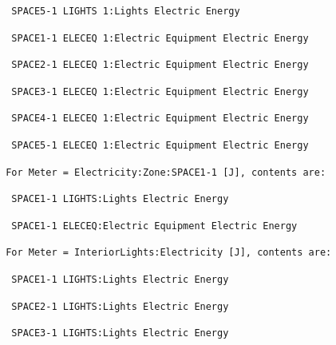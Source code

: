 \begin{lstlisting}
  SPACE5-1 LIGHTS 1:Lights Electric Energy
\end{lstlisting}

\begin{lstlisting}
  SPACE1-1 ELECEQ 1:Electric Equipment Electric Energy
\end{lstlisting}

\begin{lstlisting}
  SPACE2-1 ELECEQ 1:Electric Equipment Electric Energy
\end{lstlisting}

\begin{lstlisting}
  SPACE3-1 ELECEQ 1:Electric Equipment Electric Energy
\end{lstlisting}

\begin{lstlisting}
  SPACE4-1 ELECEQ 1:Electric Equipment Electric Energy
\end{lstlisting}

\begin{lstlisting}
  SPACE5-1 ELECEQ 1:Electric Equipment Electric Energy
\end{lstlisting}

\begin{lstlisting}
 For Meter = Electricity:Zone:SPACE1-1 [J], contents are:
\end{lstlisting}

\begin{lstlisting}
  SPACE1-1 LIGHTS:Lights Electric Energy
\end{lstlisting}

\begin{lstlisting}
  SPACE1-1 ELECEQ:Electric Equipment Electric Energy
\end{lstlisting}

\begin{lstlisting}
 For Meter = InteriorLights:Electricity [J], contents are:
\end{lstlisting}

\begin{lstlisting}
  SPACE1-1 LIGHTS:Lights Electric Energy
\end{lstlisting}

\begin{lstlisting}
  SPACE2-1 LIGHTS:Lights Electric Energy
\end{lstlisting}

\begin{lstlisting}
  SPACE3-1 LIGHTS:Lights Electric Energy
\end{lstlisting}

